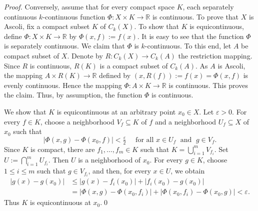 \documentclass[10pt,a4paper]{amsart}
\newcommand{\CC}{C_k}
\newcommand{\IR}{\mathbb{R}}
\newcommand{\e}{\varepsilon}
\begin{document}
\begin{proof}
Conversely, assume that for every compact space $K$, each separately continuous $k$-continuous function $\Phi:X\times K\to \IR$ is continuous. To prove that $X$ is Ascoli, fix a compact subset $K$ of $\CC(X)$. To show that $K$ is equicontinuous, define $\Phi:X\times K\to \IR$ by $\Phi(x,f):=f(x)$. It is easy to see that the function $\Phi$ is separately continuous. We claim that $\Phi$ is $k$-continuous. To this end, let $A$ be compact subset of $X$. Denote by $R:\CC(X)\to \CC(A)$ the restriction mapping. Since $R$ is continuous, $R(K)$ is a compact subset of $\CC(A)$. As $A$ is Ascoli, the mapping $A\times R(K)\to \IR$ defined by $(x,R(f)):=f(x)=\Phi(x,f)$ is evenly continuous. Hence the mapping $\Phi:A\times K\to\IR$ is continuous. This proves the claim. Thus, by assumption, the function $\Phi$ is continuous.

We show that $K$ is equicontinuous at an arbitrary point $x_0\in X$. Let $\e>0$. For every $f\in K$, choose a neighborhood $V_f\subseteq K$ of $f$ and a neighborhood $U_f\subseteq X$ of $x_0$ such that
\[
|\Phi(x,g)-\Phi(x_0,f)|<\tfrac{\e}{2} \quad \mbox{ for all } x\in U_f \; \mbox{ and }\; g\in V_f.
\]
Since $K$ is compact, there are $f_1,\dots,f_m\in K$ such that $K=\bigcup_{i=1}^m V_{f_i}$. Set $U:= \bigcap_{i=1}^m U_{f_i}$. Then $U$ is a neighborhood of $x_0$. For every $g\in K$, choose $1\leq i\leq m$ such that $g\in V_{f_i}$, and then, for every $x\in U$,  we obtain
\[
\begin{aligned}
|g(x)-g(x_0)| & \leq |g(x)-f_i(x_0)|+|f_i(x_0)-g(x_0)|\\
& =|\Phi(x,g)-\Phi(x_0,f_i)| + |\Phi(x_0,f_i)-\Phi(x_0,g)|<\e.
\end{aligned}
\]
Thus $K$ is equicontinuous at $x_0$.\qed
\end{proof}
\end{document}
